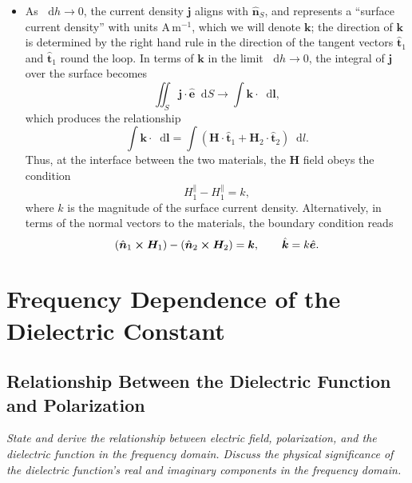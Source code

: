 \documentclass[11pt, a4paper]{article}
\newcommand{\diff}{\mathop{}\!\mathrm{d}} %
\renewcommand{\vec}[1]{\bm{#1}} %
\newcommand{\uvec}[1]{\hat{\vec{#1}}} %
\renewcommand{\H}{\vec{H}}  %
\renewcommand{\j}{\vec{j}}  %
\begin{document}
\begin{itemize}
    \item As $ \diff h \to 0 $, the current density $ \j $ aligns with $ \uvec{n}_{S} $, and represents a ``surface current density'' with units $ \si{\ampere \, \meter^{-1}} $, which we will denote $ \vec{k} $; the direction of $ \vec{k} $ is determined by the right hand rule in the direction of the tangent vectors $ \uvec{t}_{1} $ and $ \uvec{t}_{1} $ round the loop. In terms of $ \vec{k} $ in the limit $ \diff h \to 0 $, the integral of $ \j $ over the surface becomes
    \begin{equation*}
        \iint_{S} \j \cdot \uvec{e} \diff S \to \int \vec{k} \cdot \diff \vec{l},
    \end{equation*}
    which produces the relationship
    \begin{equation*}
        \int \vec{k} \cdot \diff \vec{l} = \int (\H \cdot \uvec{t}_{1} + \H_{2}\cdot \uvec{t}_{2}) \diff l.
    \end{equation*}
    Thus, at the interface between the two materials, the $ \H $ field obeys the condition 
	\begin{equation*}
        H_{1}^{\parallel} - H_{1}^{\parallel} = k,
	\end{equation*}
    where $ k $ is the magnitude of the surface current density. Alternatively, in terms of the normal vectors to the materials, the boundary condition reads
	\begin{equation*}
        (\uvec{n}_{1} \cross \H_{1}) - (\uvec{n}_{2}\cross \H_{2}) = \vec{k}, \qquad \uvec{k} = k \uvec{e}.
	\end{equation*}
\end{itemize}


\newpage
\section{Frequency Dependence of the Dielectric Constant}

\subsection{Relationship Between the Dielectric Function and Polarization}
\textit{State and derive the relationship between electric field, polarization, and the dielectric function in the frequency domain. Discuss the physical significance of the dielectric function's real and imaginary components in the frequency domain.}
\end{document}
